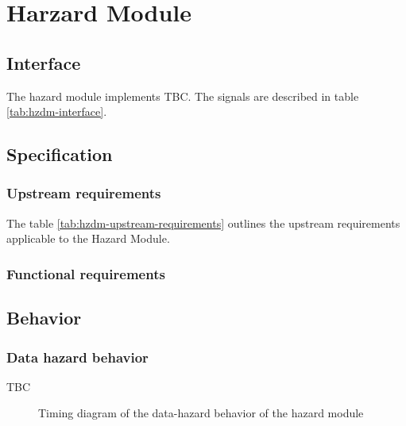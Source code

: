 \section{Harzard Module}

  \subsection{Interface}

    \begin{content}
        The hazard module implements TBC. The signals are described in table \ref{tab:hzdm-interface}. 
      \end{content}

    

  \subsection{Specification}

    \subsubsection{Upstream requirements}

      The table \ref{tab:hzdm-upstream-requirements} outlines the upstream requirements applicable to the Hazard Module.

      

    \subsubsection{Functional requirements}

  \subsection{Behavior}

    \subsubsection{Data hazard behavior}

      \begin{content}
          TBC
        \end{content}

      \begin{figure}[H]
          \centering
          
          \caption{Timing diagram of the data-hazard behavior of the hazard module}
          \label{fig:hzdm-behavior-data-hazard}
        \end{figure}


